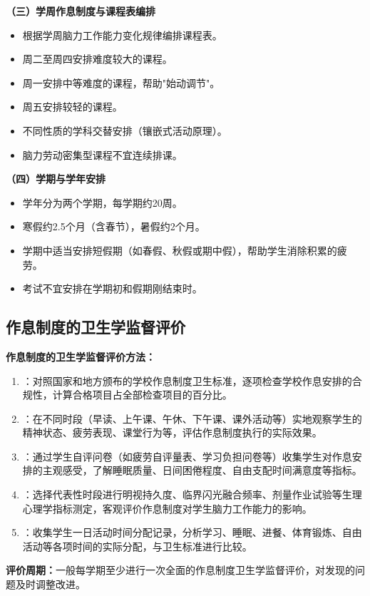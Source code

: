\begin{keybox}
\textbf{（三）学周作息制度与课程表编排}

\begin{itemize}[leftmargin=*]
    \item 根据学周脑力工作能力变化规律编排课程表。
    \item 周二至周四安排难度较大的课程。
    \item 周一安排中等难度的课程，帮助"始动调节"。
    \item 周五安排较轻的课程。
    \item 不同性质的学科交替安排（镶嵌式活动原理）。
    \item 脑力劳动密集型课程不宜连续排课。
\end{itemize}

\textbf{（四）学期与学年安排}

\begin{itemize}[leftmargin=*]
    \item 学年分为两个学期，每学期约20周。
    \item 寒假约2.5个月（含春节），暑假约2个月。
    \item 学期中适当安排短假期（如春假、秋假或期中假），帮助学生消除积累的疲劳。
    \item 考试不宜安排在学期初和假期刚结束时。
\end{itemize}
\end{keybox}

\subsection{作息制度的卫生学监督评价}

\begin{defbox}
\textbf{作息制度的卫生学监督评价方法：}

\begin{enumerate}[leftmargin=*]
    \item {}：对照国家和地方颁布的学校作息制度卫生标准，逐项检查学校作息安排的合规性，计算合格项目占全部检查项目的百分比。

    \item {}：在不同时段（早读、上午课、午休、下午课、课外活动等）实地观察学生的精神状态、疲劳表现、课堂行为等，评估作息制度执行的实际效果。

    \item {}：通过学生自评问卷（如疲劳自评量表、学习负担问卷等）收集学生对作息安排的主观感受，了解睡眠质量、日间困倦程度、自由支配时间满意度等指标。

    \item {}：选择代表性时段进行明视持久度、临界闪光融合频率、剂量作业试验等生理心理学指标测定，客观评价作息制度对学生脑力工作能力的影响。

    \item {}：收集学生一日活动时间分配记录，分析学习、睡眠、进餐、体育锻炼、自由活动等各项时间的实际分配，与卫生标准进行比较。
\end{enumerate}

\textbf{评价周期：}一般每学期至少进行一次全面的作息制度卫生学监督评价，对发现的问题及时调整改进。
\end{defbox}

